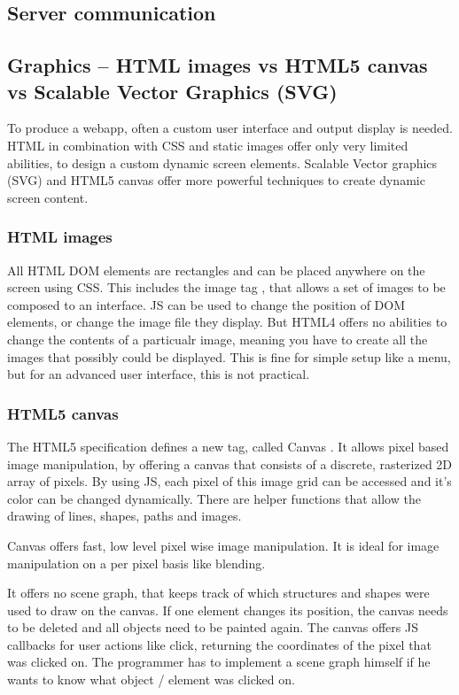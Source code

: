 \subsection{Server communication}

\subsection{Graphics -- HTML images vs HTML5 canvas vs Scalable Vector Graphics (SVG)}
To produce a webapp, often a custom user interface and output display is needed.
HTML in combination with CSS and static images offer only very limited abilities, to design a custom dynamic screen elements.
Scalable Vector graphics (SVG) and HTML5 canvas offer more powerful techniques to create dynamic screen content.

\subsubsection{HTML images}
All HTML DOM elements are rectangles and can be placed anywhere on the screen using CSS.
This includes the image tag , that allows a set of images to be composed to an interface.
JS can be used to change the position of DOM elements, or change the image file they display.
But HTML4 offers no abilities to change the contents of a particualr image, meaning you have to create all the images that possibly could be displayed.
This is fine for simple setup like a menu, but for an advanced user interface, this is not practical.

\subsubsection{HTML5 canvas}
The HTML5 specification defines a new tag, called Canvas .
It allows pixel based image manipulation, by offering a canvas that consists of a discrete, rasterized 2D array of pixels.
By using JS, each pixel of this image grid can be accessed and it's color can be changed dynamically.
There are helper functions that allow the drawing of lines, shapes, paths and images.

Canvas offers fast, low level pixel wise image manipulation.
It is ideal for image manipulation on a per pixel basis like blending.

It offers no scene graph, that keeps track of which structures and shapes were used to draw on the canvas.
If one element changes its position, the canvas needs to be deleted and all objects need to be painted again.
The canvas offers JS callbacks for user actions like click, returning the coordinates of the pixel that was clicked on.
The programmer has to implement a scene graph himself if he wants to know what object / element was clicked on.

